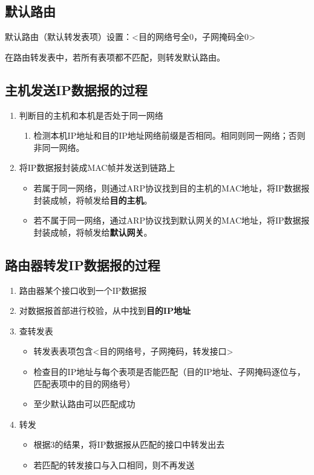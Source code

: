 \subsection{默认路由}
默认路由（默认转发表项）设置：<目的网络号全0，子网掩码全0>

在路由转发表中，若所有表项都不匹配，则转发默认路由。


\subsection{主机发送IP数据报的过程}
\begin{enumerate}
    \item 判断目的主机和本机是否处于同一网络\begin{enumerate}
        \item 检测本机IP地址和目的IP地址网络前缀是否相同。相同则同一网络；否则非同一网络。
    \end{enumerate}
    \item 将IP数据报封装成MAC帧并发送到链路上\begin{itemize}
        \item 若属于同一网络，则通过ARP协议找到目的主机的MAC地址，将IP数据报封装成帧，将帧发给\textbf{目的主机}。
        \item 若不属于同一网络，通过ARP协议找到默认网关的MAC地址，将IP数据报封装成帧，将帧发给\textbf{默认网关}。
    \end{itemize}
\end{enumerate}


\subsection{路由器转发IP数据报的过程}
\begin{enumerate}
    \item 路由器某个接口收到一个IP数据报
    \item 对数据报首部进行校验，从中找到\textbf{目的IP地址}
    \item 查转发表\begin{itemize}
        \item 转发表表项包含<目的网络号，子网掩码，转发接口>
        \item 检查目的IP地址与每个表项是否能匹配（目的IP地址、子网掩码逐位与，匹配表项中的目的网络号）
        \item 至少默认路由可以匹配成功
    \end{itemize}
    \item 转发\begin{itemize}
        \item 根据3的结果，将IP数据报从匹配的接口中转发出去
        \item 若匹配的转发接口与入口相同，则不再发送
    \end{itemize}
\end{enumerate}




